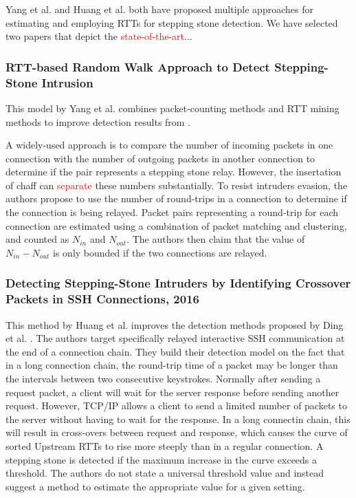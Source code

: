 \documentclass[runningheads]{llncs}\usepackage[]{graphicx}\usepackage[]{color}
\begin{document}
Yang et al. \cite{yang2015rtt,yang2007mining} and Huang et al. \cite{huang2016detecting,ding2009detecting,huang2007stepping}  both have proposed multiple approaches for estimating and employing RTTs for stepping stone detection. We have selected two papers that depict the \textcolor{red}{state-of-the-art}...

\subsubsection{RTT-based Random Walk Approach to Detect Stepping-Stone Intrusion }


This model by Yang et al. \cite{yang2015rtt} combines packet-counting methods and RTT mining methods to improve detection results from \cite{yang2007mining}. 

A widely-used approach is to compare the number of incoming packets in one connection with the number of outgoing packets in another connection  to determine if the pair represents a stepping stone relay. However, the insertation of chaff can \textcolor{red}{separate} these numbers substantially. 
To resist intruders  evasion,  the authors  propose  to use the  number of  round-trips in  a  connection  to  determine  if  the  connection  is being  relayed.
Packet pairs representing a round-trip for each connection are estimated using a combination of packet matching and clustering, and counted as $N_{in}$ and $N_{out}$. The authors then claim that the value of $N_{in}-N_{out}$ is only bounded if the two connections are relayed.


\subsubsection{Detecting Stepping-Stone Intruders by Identifying Crossover Packets in SSH Connections, 2016}

This method by Huang et al. \cite{huang2016detecting} improves the detection methods proposed by Ding et al. \cite{ding2009detecting}. The authors target specifically relayed interactive SSH communication at the end of a connection chain. They build their detection model on the fact that in a long connection chain, the round-trip time of a packet may be longer than the intervals between two consecutive keystrokes. Normally after sending a request packet, a client will wait for the server response before sending another request. However, TCP/IP allows a client to send a limited number of packets to the server without having to wait for the response. In a long connectin chain, this will result in cross-overs between request and response, which causes the curve of sorted Upstream RTTs to rise more steeply than in a regular connection. A stepping stone is detected if the maximum increase in the curve exceeds a threshold. The authors do not state a universal threshold value and instead suggest a method to estimate the appropriate value for a given setting.
\end{document}
